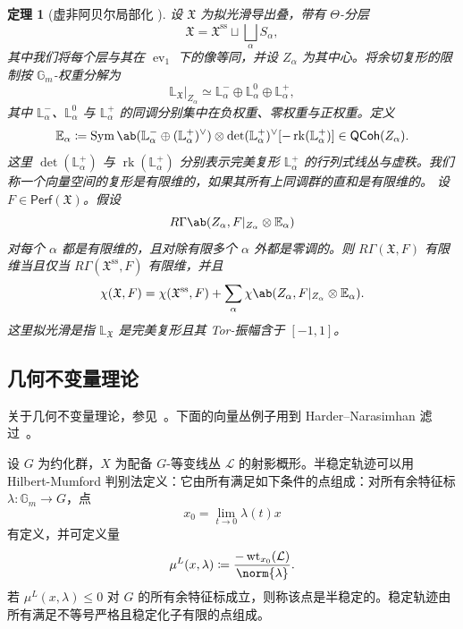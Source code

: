 \documentclass{amsart}
\newtheorem{thm}{定理}[section]
\theoremstyle{definition}
\theoremstyle{remark}
\theoremstyle{plain}
\theoremstyle{definition}
\theoremstyle{remark}
\newcommand{\G}{\mathbb{G}}
\newcommand{\E}{\mathbb{E}}
\renewcommand{\L}{\mathbb{L}}
\newcommand{\mc}[1]{\mathcal{#1}}
\newcommand{\mf}[1]{\mathfrak{#1}}
\newcommand{\mr}[1]{\mathrm{#1}}
\newcommand{\on}[1]{\operatorname{#1}}
\newcommand{\ms}[1]{\mathsf{#1}}
\newcommand{\1}{\mathbf{1}}
\newcommand{\2}{\mathbf{2}}
\newcommand{\3}{\mathbf{3}}
\DeclareMathOperator{\ev}{ev}
\begin{document}
\begin{thm}[虚非阿贝尔局部化 {\cite[Theorem~5.1]{HLlocalization}}]
    设 \(\mf{X}\) 为拟光滑导出叠，带有 \(\Theta\)-分层
    \[
        \mf{X}
        =
        \mf{X}^{\mr{ss}}
        \sqcup
        \bigsqcup_\alpha S_\alpha,
    \]
    其中我们将每个层与其在 \(\ev_1\) 下的像等同，并设 \(Z_\alpha\) 为其中心。将余切复形的限制按 \(\G_m\)-权重分解为
    \[
        \L_{\mf{X}}|_{Z_\alpha}
        \simeq
        \L_\alpha^-
        \oplus
        \L_\alpha^0
        \oplus
        \L_\alpha^+,
    \]
    其中 \(\L_\alpha^-\)、\(\L_\alpha^0\) 与 \(\L_\alpha^+\) 的同调分别集中在负权重、零权重与正权重。定义
    \[
        \E_\alpha
        \coloneqq
        \on{Sym}\ab(
            \L_\alpha^-
            \oplus
            (\L_\alpha^+)^\vee
        )
        \otimes
        \det(\L_\alpha^+)^\vee
        [-\on{rk}(\L_\alpha^+)]
        \in
        \ms{QCoh}(Z_\alpha).
    \]
    这里 \(\det(\L_\alpha^+)\) 与 \(\on{rk}(\L_\alpha^+)\) 分别表示完美复形 \(\L_\alpha^+\) 的行列式线丛与虚秩。我们称一个向量空间的复形是有限维的，如果其所有上同调群的直和是有限维的。
    设 \(F\in\ms{Perf}(\mf{X})\)。假设
    \[
        R\Gamma\ab(
            Z_\alpha,
            F|_{Z_\alpha}\otimes\E_\alpha
        )
    \]
    对每个 \(\alpha\) 都是有限维的，且对除有限多个 \(\alpha\) 外都是零调的。则 \(R\Gamma(\mf{X},F)\) 有限维当且仅当 \(R\Gamma(\mf{X}^{\mr{ss}},F)\) 有限维，并且
    \[
        \chi(\mf{X},F)
        =
        \chi(\mf{X}^{\mr{ss}},F)
        +
        \sum_\alpha
        \chi\ab(
            Z_\alpha,
            F|_{Z_\alpha}\otimes\E_\alpha
        ).
    \]
    这里拟光滑是指 \(\L_{\mf{X}}\) 是完美复形且其 Tor-振幅含于 \([-1,1]\)。
\end{thm}


\subsection{几何不变量理论}%
\label{sub:Geometric invariant theory}

关于几何不变量理论，参见~\cite{MFK1994}。下面的向量丛例子用到 Harder--Narasimhan 滤过~\cite{HN1975}。

设 \(G\) 为约化群，\(X\) 为配备 \(G\)-等变线丛 \(\mc{L}\) 的射影概形。半稳定轨迹可以用 Hilbert-Mumford 判别法定义：它由所有满足如下条件的点组成：对所有余特征标
\(\lambda \colon \G_m \to G\)，点 
\[ x_0 = \lim_{t \to 0} \lambda(t) x \]
有定义，并可定义量
\[ \mu^L(x, \lambda) \coloneqq \frac{-\on{wt}_{x_0}(\mc{L})}{\norm{\lambda}}. \]
若 \(\mu^L(x, \lambda) \leq 0\) 对 \(G\) 的所有余特征标成立，则称该点是半稳定的。稳定轨迹由所有满足不等号严格且稳定化子有限的点组成。
\end{document}
